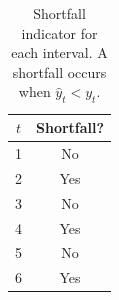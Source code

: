 \begin{table}[h!]
\centering
\begin{tabular}{c|c}
\hline
$t$ & Shortfall? \\ \hline
1 & No \\
2 & Yes \\
3 & No \\
4 & Yes \\
5 & No \\
6 & Yes \\ \hline
\end{tabular}
\caption{Shortfall indicator for each interval. A shortfall occurs when $\hat{y}_t < y_t$.}
\label{tab:frs_example_shortfall}
\end{table}
